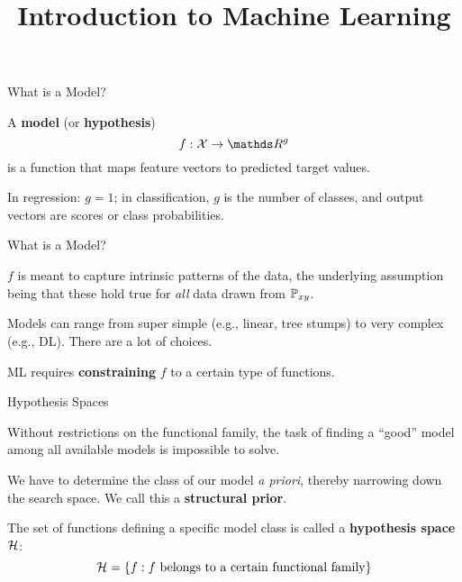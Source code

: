 \documentclass[11pt,compress,t,notes=noshow, xcolor=table]{beamer}
\title{Introduction to Machine Learning}
\begin{document}


\begin{framei}{What is a Model?}
\item A \textbf{model} (or \textbf{hypothesis}) 
$$
f : \Xspace \rightarrow \R^g
$$ 
is a function that maps feature vectors to predicted target values.
\item In regression: $g = 1$; in classification, $g$ is the number of classes, and output vectors are scores or class probabilities.
\end{framei}


\begin{framei}{What is a Model?}
\item $f$ is meant to capture intrinsic patterns of the data, the underlying assumption being that these hold true for \emph{all} data drawn from $\mathbb{P}_{xy}$.
\item Models can range from super simple (e.g., linear, tree stumps) to very complex (e.g., DL). There are a lot of choices.
\vfill
{}
{
}
\item ML requires \textbf{constraining} $f$ to a certain type of functions.
\end{framei}


\begin{framei}{Hypothesis Spaces}
\item Without restrictions on the functional family, the task of finding a \enquote{good} model among all available models is impossible to solve.
\item We have to determine the class of our model \emph{a priori}, thereby narrowing down the search space. We call this a \textbf{structural prior}.
\item The set of functions defining a specific model class is called a 
\textbf{hypothesis space} $\mathcal{H}$:
$$\mathcal{H} = \{f: f \text{ belongs to a certain functional family}\}$$
\end{framei}
\end{document}
